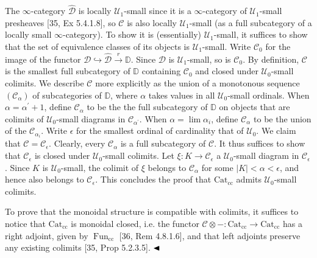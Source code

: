 \documentclass[10pt,a4paper]{article}
\begin{document}
The $\infty$-category $\widehat{{\mathcal{D}}}$ is locally ${\mathcal{U}}_{1}$-small since it is a $\infty$-category of ${\mathcal{U}}_{1}$-small presheaves [35, Ex 5.4.1.8], so ${\mathcal{C}}$ is also locally ${\mathcal{U}}_{1}$-small (as a full subcategory of a locally small $\infty$-category). To show it is (essentially) ${\mathcal{U}}_{1}$-small, it suffices to show that the set of equivalence classes of its objects is ${\mathcal{U}}_{1}$-small. Write ${\mathcal{C}}_{0}$ for the image of the functor ${\mathcal{D}}\hookrightarrow\widehat{\mathcal{D}}\xrightarrow{r}\mathbb{D}$. Since ${\mathcal{D}}$ is ${\mathcal{U}}_{1}$-small, so is ${\mathcal{C}}_{0}$. By definition, ${\mathcal{C}}$ is the smallest full subcategory of $\mathbb{D}$ containing ${\mathcal{C}}_{0}$ and closed under ${\mathcal{U}}_{0}$-small colimits. We describe ${\mathcal{C}}$ more explicitly as the union of a monotonous sequence $({\mathcal{C}}_{\alpha})$ of subcategories of $\mathbb{D}$, where $\alpha$ takes values in all ${\mathcal{U}}_{0}$-small ordinals. When $\alpha=\alpha^{\prime}+1$, define ${\mathcal{C}}_{\alpha}$ to be the the full subcategory of $\mathbb{D}$ on objects that are colimits of ${\mathcal{U}}_{0}$-small diagrams in ${\mathcal{C}}_{\alpha^{\prime}}$. When $\alpha=\lim\alpha_{i}$, define ${\mathcal{C}}_{\alpha}$ to be the union of the ${\mathcal{C}}_{\alpha_{i}}$. Write $\epsilon$ for the smallest ordinal of cardinality that of ${\mathcal{U}}_{0}$. We claim that ${\mathcal{C}}={\mathcal{C}}_{\epsilon}$. Clearly, every ${\mathcal{C}}_{\alpha}$ is a full subcategory of ${\mathcal{C}}$. It thus suffices to show that ${\mathcal{C}}_{\epsilon}$ is closed under ${\mathcal{U}}_{0}$-small colimits. Let $\xi:K\to{\mathcal{C}}_{\epsilon}$ a ${\mathcal{U}}_{0}$-small diagram in ${\mathcal{C}}_{\epsilon}$. Since $K$ is ${\mathcal{U}}_{0}$-small, the colimit of $\xi$ belongs to ${\mathcal{C}}_{\alpha}$ for some $|K|<\alpha<\epsilon$, and hence also belongs to ${\mathcal{C}}_{\epsilon}$. This concludes the proof that $\operatorname{Cat_{cc}}$ admits ${\mathcal{U}}_{0}$-small colimits.\par
 
 
 
To prove that the monoidal structure is compatible with colimits, it suffices to notice that $\operatorname{Cat_{cc}}$ is monoidal closed, i.e. the functor ${\mathcal{C}}\otimes-:\operatorname{Cat_{cc}}\to\operatorname{Cat_{cc}}$ has a right adjoint, given by $\operatorname{Fun}_{\text{cc}}$ [36, Rem 4.8.1.6], and that left adjoints preserve any existing colimits [35, Prop 5.2.3.5]. $\hfill\blacktriangleleft$\par
 
\end{document}
